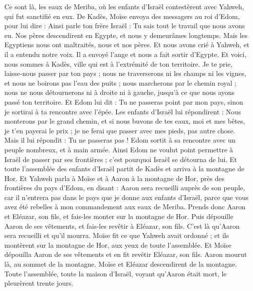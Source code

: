 \begin{multicols}{2}
Ce sont là, les eaux de Meriba, où les enfants d'Israël contestèrent avec Yahweh, qui fut sanctifié en eux.
De Kadès, Moïse envoya des messagers au roi d'Edom, pour lui dire : Ainsi parle ton frère Israël : Tu sais tout le travail que nous avons eu.
Nos pères descendirent en Egypte, et nous y demeurâmes longtemps. Mais les Egyptiens nous ont maltraités, nous et nos pères.
Et nous avons crié à Yahweh, et il a entendu notre voix. Il a envoyé l'ange et nous a fait sortir d'Egypte. Et voici, nous sommes à Kadès, ville qui est à l'extrémité de ton territoire.
Je te prie, laisse-nous passer par ton pays ; nous ne traverserons ni les champs ni les vignes, et nous ne boirons pas l'eau des puits ; nous marcherons par le chemin royal ; nous ne nous détournerons ni à droite ni à gauche, jusqu'à ce que nous ayons passé ton territoire.
Et Edom lui dit : Tu ne passeras point par mon pays, sinon je sortirai à ta rencontre avec l'épée.
Les enfants d'Israël lui répondirent : Nous monterons par le grand chemin, et si nous buvons de tes eaux, moi et mes bêtes, je t'en payerai le prix ; je ne ferai que passer avec mes pieds, pas autre chose.
Mais il lui répondit : Tu ne passeras pas ! Edom sortit à sa rencontre avec un peuple nombreux, et à main armée.
Ainsi Edom ne voulut point permettre à Israël de passer par ses frontières ; c’est pourquoi Israël se détourna de lui.
Et toute l'assemblée des enfants d'Israël partit de Kadès et arriva à la montagne de Hor.
Et Yahweh parla à Moïse et à Aaron à la montagne de Hor, près des frontières du pays d'Edom, en disant :
Aaron sera recueilli auprès de son peuple, car il n'entrera pas dans le pays que je donne aux enfants d'Israël, parce que vous avez été rebelles à mon commandement aux eaux de Meriba.
Prends donc Aaron et Eléazar, son fils, et fais-les monter sur la montagne de Hor.
Puis dépouille Aaron de ses vêtements, et fais-les revêtir à Eléazar, son fils. C'est là qu'Aaron sera recueilli et qu'il mourra.
Moïse fit ce que Yahweh avait ordonné ; et ils montèrent sur la montagne de Hor, aux yeux de toute l'assemblée.
Et Moïse dépouilla Aaron de ses vêtements et en fit revêtir Eléazar, son fils. Aaron mourut là, au sommet de la montagne. Moïse et Eléazar descendirent de la montagne.
Toute l'assemblée, toute la maison d'Israël, voyant qu'Aaron était mort, le pleurèrent trente jours.

\end{multicols}
